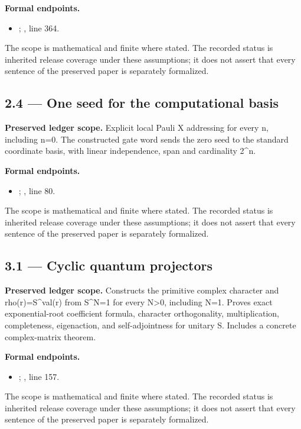 \textbf{Formal endpoints.}\begin{itemize}
\item {}; , line 364.
\end{itemize}
The scope is mathematical and finite where stated. The recorded status is inherited release coverage under these assumptions; it does not assert that every sentence of the preserved paper is separately formalized.

\subsection{2.4 — One seed for the computational basis}
\label{result:2.4}
\textbf{Preserved ledger scope.} Explicit local Pauli X addressing for every n, including n=0. The constructed gate word sends the zero seed to the standard coordinate basis, with linear independence, span and cardinality 2\textasciicircum{}n.

\textbf{Formal endpoints.}\begin{itemize}
\item {}; , line 80.
\end{itemize}
The scope is mathematical and finite where stated. The recorded status is inherited release coverage under these assumptions; it does not assert that every sentence of the preserved paper is separately formalized.

\subsection{3.1 — Cyclic quantum projectors}
\label{result:3.1}
\textbf{Preserved ledger scope.} Constructs the primitive complex character and rho(r)=S\textasciicircum{}val(r) from S\textasciicircum{}N=1 for every N>0, including N=1. Proves exact exponential-root coefficient formula, character orthogonality, multiplication, completeness, eigenaction, and self-adjointness for unitary S. Includes a concrete complex-matrix theorem.

\textbf{Formal endpoints.}\begin{itemize}
\item {}; , line 157.
\end{itemize}
The scope is mathematical and finite where stated. The recorded status is inherited release coverage under these assumptions; it does not assert that every sentence of the preserved paper is separately formalized.

